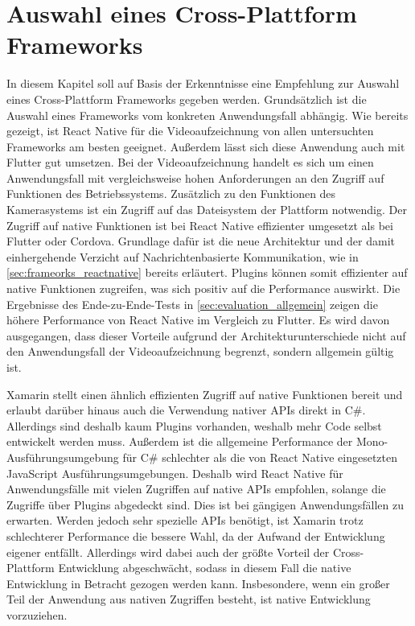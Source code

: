 \chapter{Auswahl eines Cross-Plattform Frameworks}
\label{ch:auswahl}

In diesem Kapitel soll auf Basis der Erkenntnisse eine Empfehlung zur Auswahl eines Cross-Plattform Frameworks gegeben werden.
Grundsätzlich ist die Auswahl eines Frameworks vom konkreten Anwendungsfall abhängig.
Wie bereits gezeigt, ist React Native für die Videoaufzeichnung von allen untersuchten Frameworks am besten geeignet.
Außerdem lässt sich diese Anwendung auch mit Flutter gut umsetzen.
Bei der Videoaufzeichnung handelt es sich um einen Anwendungsfall mit vergleichsweise hohen Anforderungen an den Zugriff auf Funktionen des Betriebssystems.
Zusätzlich zu den Funktionen des Kamerasystems ist ein Zugriff auf das Dateisystem der Plattform notwendig.
Der Zugriff auf native Funktionen ist bei React Native effizienter umgesetzt als bei Flutter oder Cordova.
Grundlage dafür ist die neue Architektur und der damit einhergehende Verzicht auf Nachrichtenbasierte Kommunikation, wie in \autoref{sec:frameorks_reactnative} bereits erläutert.
Plugins können somit effizienter auf native Funktionen zugreifen, was sich positiv auf die Performance auswirkt.
Die Ergebnisse des Ende-zu-Ende-Tests in \autoref{sec:evaluation_allgemein} zeigen die höhere Performance von React Native im Vergleich zu Flutter.
Es wird davon ausgegangen, dass dieser Vorteile aufgrund der Architekturunterschiede nicht auf den Anwendungsfall der Videoaufzeichnung begrenzt, sondern allgemein gültig ist.

Xamarin stellt einen ähnlich effizienten Zugriff auf native Funktionen bereit und erlaubt darüber hinaus auch die Verwendung nativer \acp{API} direkt in C\#.
Allerdings sind deshalb kaum Plugins vorhanden, weshalb mehr Code selbst entwickelt werden muss.
Außerdem ist die allgemeine Performance der Mono-Ausführungsumgebung für C\# schlechter als die von React Native eingesetzten JavaScript Ausführungsumgebungen.
Deshalb wird React Native für Anwendungsfälle mit vielen Zugriffen auf native \acp{API} empfohlen, solange die Zugriffe über Plugins abgedeckt sind.
Dies ist bei gängigen Anwendungsfällen zu erwarten.
Werden jedoch sehr spezielle \acp{API} benötigt, ist Xamarin trotz schlechterer Performance die bessere Wahl, da der Aufwand der Entwicklung eigener entfällt.
Allerdings wird dabei auch der größte Vorteil der Cross-Plattform Entwicklung abgeschwächt, sodass in diesem Fall die native Entwicklung in Betracht gezogen werden kann.
Insbesondere, wenn ein großer Teil der Anwendung aus nativen Zugriffen besteht, ist native Entwicklung vorzuziehen.

